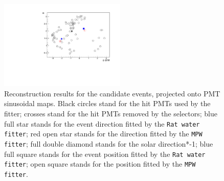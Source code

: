 \begin{figure}[htbp]
{\begin{minipage}[t]{0.4\textwidth}
			\centering
			\includegraphics[width=6cm]{PMTmap_100663.pdf}
		\end{minipage}
	}
	\caption[Reconstruction results for the candidate events, projected onto PMT sinusoidal maps.]{Reconstruction results for the candidate events, projected onto PMT sinusoidal maps. Black circles stand for the hit PMTs used by the fitter; crosses stand for the hit PMTs removed by the selectors; blue full star stands for the event direction fitted by the \texttt{Rat water fitter}; red open star stands for the direction fitted by the \texttt{MPW fitter}; full double diamond stands for the solar direction*-1; blue full square stands for the event position fitted by the \texttt{Rat water fitter}; open square stands for the position fitted by the \texttt{MPW fitter}.	\label{fig:openDataSetCandidate}}
\end{figure}


